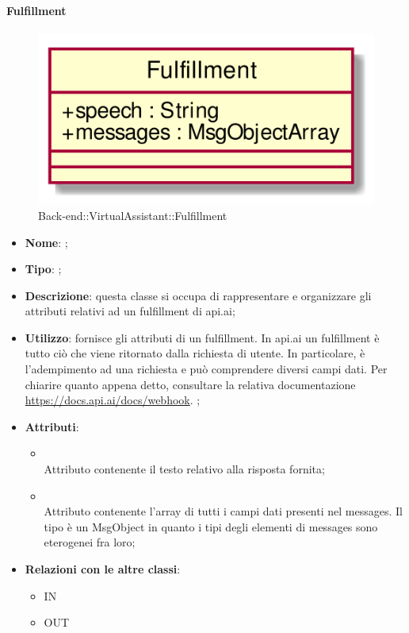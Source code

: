 \hypertarget{Fulfillment_label}{\paragraph{Fulfillment}}
\begin{figure}[h]
	\centering
	\includegraphics[width=\textwidth,height=\textheight,keepaspectratio]{images/ClassFulfillment.png}
	\caption{Back-end::VirtualAssistant::Fulfillment}
\end{figure}
\begin{itemize}
	\item \textbf{Nome}: ;
	\item \textbf{Tipo}: ;
	\item \textbf{Descrizione}: questa classe si occupa di rappresentare e organizzare gli attributi relativi ad un fulfillment di api.ai;
	\item \textbf{Utilizzo}: fornisce gli attributi di un fulfillment.
In api.ai un fulfillment è tutto ciò che viene ritornato dalla richiesta di utente. In particolare, è l'adempimento ad una richiesta e può comprendere diversi campi dati.
Per chiarire quanto appena detto, consultare la relativa documentazione \url{https://docs.api.ai/docs/webhook}.
;
	\item \textbf{Attributi}:
	\begin{itemize}
		\item[]  \\
		Attributo contenente il testo relativo alla risposta fornita;
		\item[]  \\
		Attributo contenente l'array di tutti i campi dati presenti nel messages.
Il tipo è un MsgObject in quanto i tipi degli elementi di messages sono eterogenei fra loro;
	\end{itemize}
	\item \textbf{Relazioni con le altre classi}:
	\begin{itemize}
		\item IN \hyperlink{ProcessingResult_label}{}
		\item OUT \hyperlink{MsgObject_label}{}
	\end{itemize}
\end{itemize}
\FloatBarrier


